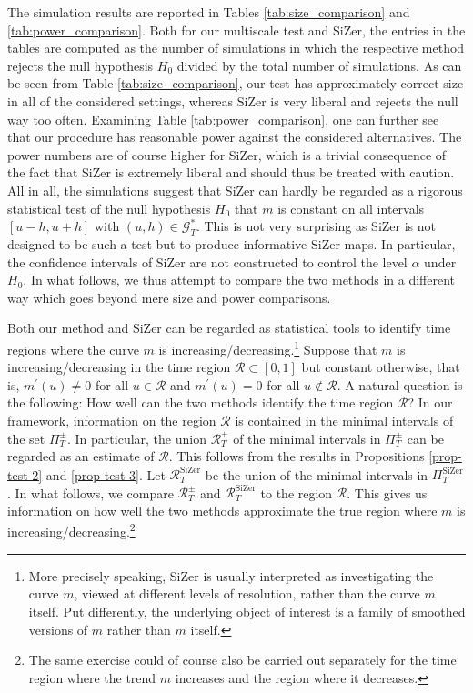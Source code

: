 The simulation results are reported in Tables \ref{tab:size_comparison} and \ref{tab:power_comparison}. Both for our multiscale test and SiZer, the entries in the tables are computed as the number of simulations in which the respective method rejects the null hypothesis $H_0$ divided by the total number of simulations. As can be seen from Table \ref{tab:size_comparison}, our test has approximately correct size in all of the considered settings, whereas SiZer is very liberal and rejects the null way too often. Examining Table \ref{tab:power_comparison}, one can further see that our procedure has reasonable power against the considered alternatives. The power numbers are of course higher for SiZer, which is a trivial consequence of the fact that SiZer is extremely liberal and should thus be treated with caution. All in all, the simulations suggest that SiZer can hardly be regarded as a rigorous statistical test of the null hypothesis $H_0$ that $m$ is constant on all intervals $[u-h,u+h]$ with $(u,h) \in \mathcal{G}_T^*$. This is not very surprising as SiZer is not designed to be such a test but to produce informative SiZer maps. In particular, the confidence intervals of SiZer are not constructed to control the level $\alpha$ under $H_0$. In what follows, we thus attempt to compare the two methods in a different way which goes beyond mere size and power comparisons. 


Both our method and SiZer can be regarded as statistical tools to identify time regions where the curve $m$ is increasing/decreasing.\footnote{More precisely speaking, SiZer is usually interpreted as investigating the curve $m$, viewed at different levels of resolution, rather than the curve $m$ itself. Put differently, the underlying object of interest is a family of smoothed versions of $m$ rather than $m$ itself.} Suppose that $m$ is increasing/decreasing in the time region $\mathcal{R} \subset [0,1]$ but constant otherwise, that is, $m^\prime(u) \ne 0$ for all $u \in \mathcal{R}$ and $m^\prime(u) = 0$ for all $u \notin \mathcal{R}$. A natural question is the following: How well can the two methods identify the time region $\mathcal{R}$? In our framework, information on the region $\mathcal{R}$ is contained in the minimal intervals of the set $\Pi_T^\pm$. In particular, the union $\mathcal{R}_T^\pm$ of the minimal intervals in $\Pi_T^\pm$ can be regarded as an estimate of $\mathcal{R}$. This follows from the results in Propositions \ref{prop-test-2} and \ref{prop-test-3}. Let $\mathcal{R}_T^{\text{SiZer}}$ be the union of the minimal intervals in $\Pi_T^{\text{SiZer}}$. In what follows, we compare $\mathcal{R}_T^\pm$ and $\mathcal{R}_T^{\text{SiZer}}$ to the region $\mathcal{R}$. This gives us information on how well the two methods approximate the true region where $m$ is increasing/decreasing.\footnote{The same exercise could of course also be carried out separately for the time region where the trend $m$ increases and the region where it decreases.} 


